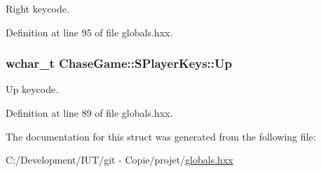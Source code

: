 Right keycode. 



Definition at line 95 of file globals.\-hxx.

\hypertarget{struct_chase_game_1_1_s_player_keys_a0153d90bee31d3959e7a79377c4dd927}{
\subsubsection[{Up}]{\setlength{\rightskip}{0pt plus 5cm}wchar\-\_\-t Chase\-Game\-::\-S\-Player\-Keys\-::\-Up}}\label{struct_chase_game_1_1_s_player_keys_a0153d90bee31d3959e7a79377c4dd927}


Up keycode. 



Definition at line 89 of file globals.\-hxx.



The documentation for this struct was generated from the following file\-:\begin{DoxyCompactItemize}
\item 
C\-:/\-Development/\-I\-U\-T/git -\/ Copie/projet/\hyperlink{globals_8hxx}{globals.\-hxx}\end{DoxyCompactItemize}
